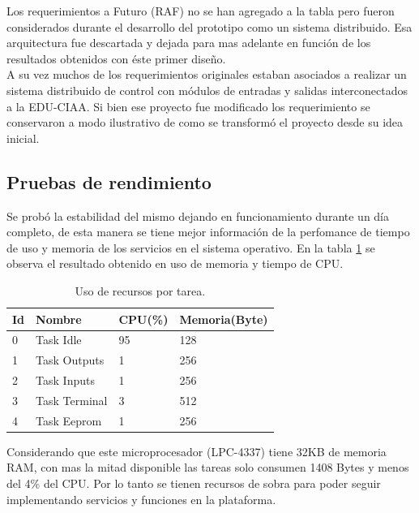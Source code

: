 Los requerimientos a Futuro (RAF) no se han agregado a la tabla pero fueron considerados durante el desarrollo del prototipo como un sistema distribuido. Esa arquitectura fue descartada y dejada para mas adelante en función de los resultados obtenidos con éste primer diseño.\\
A su vez muchos de los requerimientos originales estaban asociados a realizar un sistema distribuido de control con módulos de entradas y salidas interconectados a la EDU-CIAA. Si bien ese proyecto fue modificado los requerimiento se conservaron a modo ilustrativo de como se transformó el proyecto desde su idea inicial.
\subsection{ Pruebas de rendimiento }

Se probó la estabilidad del mismo dejando en funcionamiento durante un día completo, de esta manera se tiene mejor información de la perfomance de tiempo de uso y memoria de los servicios en el sistema operativo. En la tabla \ref{tabla_rendimiento} se observa el resultado obtenido en uso de memoria y tiempo de CPU.

\begin{table}[h!]
\centering
\begin{tabular}{ m{1.0cm}|m{3.0cm}|m{2.0cm}|m{2.5cm} }\hline
{\textbf{Id}} &{\textbf{Nombre}} & {\textbf{CPU(\%)}} & {\textbf{Memoria(Byte)}}\\ \hline
{0} & {Task Idle} & { 95 } & { 128 }\\ \hline
{1} & {Task Outputs} & { 1 } & { 256 }\\ \hline
{2} & {Task Inputs}  & { 1 } & { 256 }\\ \hline
{3} & {Task Terminal} & { 3 } & { 512 }\\ \hline
{4} & {Task Eeprom } & { 1 } & { 256 }\\ \hline
\end{tabular}
\caption{Uso de recursos por tarea.}
\label{tabla_rendimiento}
\end{table}

Considerando que este microprocesador (LPC-4337) tiene 32KB de memoria RAM, con mas la mitad disponible las tareas solo consumen 1408 Bytes y menos del 4\% del CPU. Por lo tanto se tienen recursos de sobra para poder seguir implementando servicios y funciones en la plataforma.

